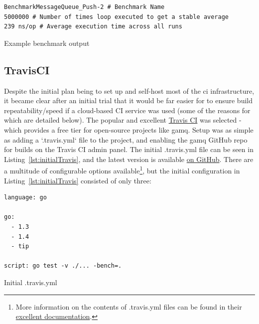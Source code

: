 \begin{listing}
  \centering
  \begin{verbatim}
BenchmarkMessageQueue_Push-2 # Benchmark Name
5000000 # Number of times loop executed to get a stable average
239 ns/op # Average execution time across all runs
  \end{verbatim}
  \caption{Example benchmark output}
  \label{lst:goBenchmarkOutput}
\end{listing}


\subsection{TravisCI}
\label{sub:TravisCI}


Despite the initial plan being to set up and self-host most of the \gls{ci}
infrastructure, it became clear after an initial trial that it would be far
easier for to ensure build repeatability/speed if a cloud-based CI service was
used (some of the reasons for which are detailed below). The popular and
excellent \href{https://travis-ci.org/}{Travis CI} was selected - which provides
a free tier for open-source projects like gamq. Setup was as simple as adding a
`.travis.yml` file to the project, and enabling the gamq GitHub repo for builds
on the Travis CI admin panel. The initial .travis.yml file can be seen in
Listing~\ref{lst:initialTravis}, and the latest version is available
\href{https://github.com/FireEater64/gamq/blob/master/.travis.yml}{on GitHub}.
There are a multitude of configurable options available\footnote{More
information on the contents of .travis.yml files can be found in their
\href{https://docs.travis-ci.com/}{excellent documentation}.}, but the initial
configuration in Listing~\ref{lst:initialTravis} consisted of only three:

\begin{listing}
  \centering
  \begin{verbatim}
language: go

go:
  - 1.3
  - 1.4
  - tip

script: go test -v ./... -bench=.
  \end{verbatim}
  \caption{Initial .travis.yml}
  \label{lst:initialTravis}
\end{listing}

